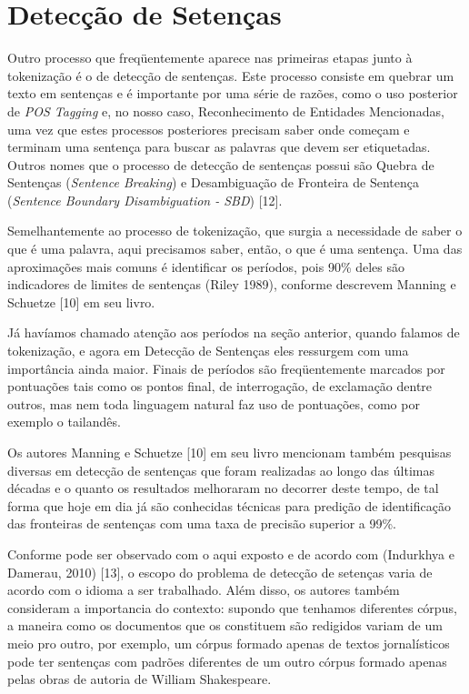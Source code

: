 \documentclass[11pt]{report}
\begin{document}
\section{Detecção de Setenças}

\indent\indent Outro processo que freqüentemente aparece nas primeiras etapas junto à tokenização é o de detecção de sentenças. Este processo consiste em
quebrar um texto em sentenças e é importante por uma série de razões, como o uso posterior de \textit{POS Tagging} e, no nosso caso, Reconhecimento de Entidades Mencionadas, uma
vez que estes processos posteriores precisam saber onde começam e terminam uma sentença para buscar as palavras que devem ser etiquetadas. Outros nomes que o processo de
detecção de sentenças possui são Quebra de Sentenças (\textit{Sentence Breaking}) e Desambiguação de Fronteira de Sentença (\textit{Sentence Boundary Disambiguation - SBD}) [12].

Semelhantemente ao processo de tokenização, que surgia a necessidade de saber o que é uma palavra, aqui precisamos saber, então, o que é uma sentença. Uma das aproximações
mais comuns é identificar os períodos, pois 90\% deles são indicadores de limites de sentenças (Riley 1989), conforme descrevem Manning e Schuetze [10] em seu livro.

Já havíamos chamado atenção aos períodos na seção anterior, quando falamos de tokenização, e agora em Detecção de Sentenças eles ressurgem com uma importância ainda maior. Finais de
períodos são freqüentemente marcados por pontuações tais como os pontos final, de interrogação, de exclamação dentre outros, mas nem toda linguagem natural faz uso
de pontuações, como por exemplo o tailandês.

Os autores Manning e Schuetze [10] em seu livro mencionam também pesquisas diversas em detecção de sentenças que foram realizadas ao longo das últimas décadas e o quanto
os resultados melhoraram no decorrer deste tempo, de tal forma que hoje em dia já são conhecidas técnicas para predição de identificação das fronteiras de sentenças com uma
taxa de precisão superior a 99\%.

Conforme pode ser observado com o aqui exposto e de acordo com (Indurkhya e Damerau, 2010) [13], o escopo do problema de detecção de setenças varia de acordo com o idioma
a ser trabalhado. Além disso, os autores também consideram a importancia do contexto: supondo que tenhamos diferentes córpus, a maneira como os documentos que os
constituem são redigidos variam de um meio pro outro, por exemplo, um córpus formado apenas de textos jornalísticos pode ter sentenças com padrões diferentes de um outro
córpus formado apenas pelas obras de autoria de William Shakespeare.
\end{document}
